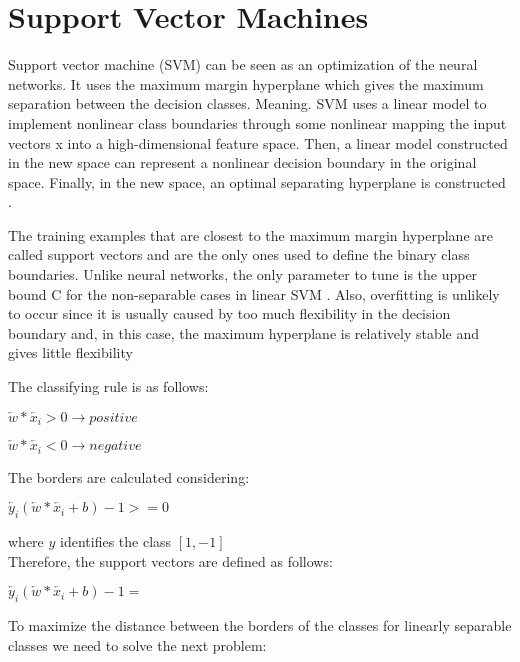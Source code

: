 
\section{Support Vector Machines}
Support vector machine (SVM) can be seen as an optimization of the neural networks. It uses the maximum margin hyperplane which gives the maximum separation between the decision classes. Meaning. SVM uses a linear model to implement nonlinear class boundaries through some nonlinear mapping the input vectors x into a high-dimensional feature space. Then, a linear model constructed in the new space can represent a nonlinear decision boundary in the original space. Finally, in the new space, an optimal separating hyperplane is constructed \cite{kim2003financial}. 

The training examples that are closest to the maximum margin hyperplane are called support vectors and are the only ones used to define the binary class boundaries. Unlike neural networks, the only parameter to tune is the upper bound C for the non-separable cases in linear SVM \cite{drucker1999support}. Also, overfitting is unlikely to occur since it is usually caused by too much flexibility in the decision boundary and, in this case, the maximum hyperplane is relatively stable and gives little flexibility \cite{zhang1998forecasting}

The classifying rule is as follows:

\centerline{$\overleftarrow{w} * \overleftarrow{x_i} > 0  \rightarrow  positive $ \\}
\centerline{$\overleftarrow{w} * \overleftarrow{x_i} < 0  \rightarrow  negative $\\} 

The borders are calculated considering: \\
\centerline{ $\overleftarrow{y_i} (\overleftarrow{w}*\overleftarrow{x_i}+b)-1>=0$ \\}
where $y$ identifies the class $[1,-1]$\\

Therefore, the support vectors are defined as follows: \\
\centerline{$\overleftarrow{y_i} (\overleftarrow{w}*\overleftarrow{x_i}+b)-1=$\\}

To maximize the distance between the borders of the classes for linearly separable classes we need to solve the next problem:

